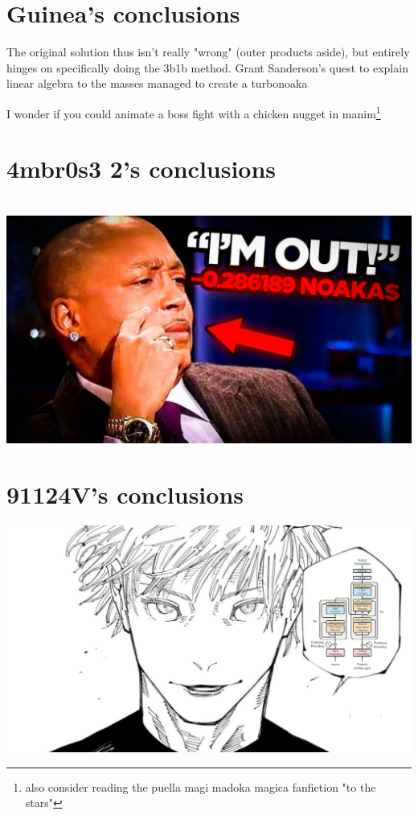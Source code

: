 \documentclass{article}
\begin{document}
\section{Guinea's conclusions}
The original solution thus isn't really "wrong" (outer products aside), but entirely hinges on specifically doing the 3b1b method.
Grant Sanderson's quest to explain linear algebra to the masses managed to create a turbonoaka

I wonder if you could animate a boss fight with a chicken nugget in manim\footnote{also consider reading the puella magi madoka magica fanfiction "to the stars"}

\newpage
\section{4mbr0s3 2's conclusions}

\\

\includegraphics[width=\textwidth]{im_out_2.png}

\section{91124V's conclusions}
\includegraphics[width=\textwidth]{dsaf.jpg}
\end{document}
